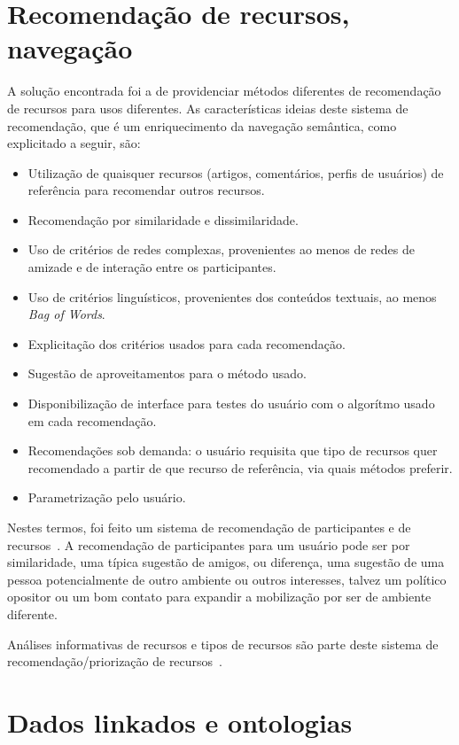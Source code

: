 \documentclass[a4paper, 11pt]{article} %
\begin{document}
\section*{Recomendação de recursos, navegação}
A solução encontrada foi a de providenciar métodos diferentes de recomendação de recursos para usos diferentes. As características ideias deste sistema de recomendação, que é um enriquecimento da navegação semântica, como explicitado a seguir, são:


\begin{itemize}
    \item Utilização de quaisquer recursos (artigos, comentários, perfis de usuários) de referência para recomendar outros recursos.
    \item Recomendação por similaridade e dissimilaridade.
    \item Uso de critérios de redes complexas, provenientes ao menos de redes de amizade e de interação entre os participantes.
    \item Uso de critérios linguísticos, provenientes dos conteúdos textuais, ao menos \emph{Bag of Words}.
    \item Explicitação dos critérios usados para cada recomendação.
    \item Sugestão de aproveitamentos para o método usado.
    \item Disponibilização de interface para testes do usuário com o algorítmo usado em cada recomendação.
    \item Recomendações sob demanda: o usuário requisita que tipo de recursos quer recomendado a partir de que recurso de referência, via quais métodos preferir.
    \item Parametrização pelo usuário.
\end{itemize}


Nestes termos, foi feito um sistema de recomendação de participantes e de recursos~\cite{pnud4}. A recomendação de participantes para um usuário pode ser por similaridade, uma típica sugestão de amigos, ou diferença, uma sugestão de uma pessoa potencialmente de outro ambiente ou outros interesses, talvez um político opositor ou um bom contato para expandir a mobilização por ser de ambiente diferente.

Análises informativas de recursos e tipos de recursos são parte deste sistema de recomendação/priorização de recursos~\cite{pnud3}.


\section*{Dados linkados e ontologias}
\end{document}
